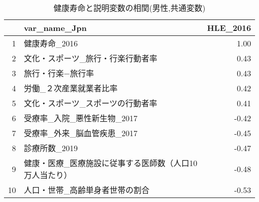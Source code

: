 \begin{table}[H]
\centering
\caption{健康寿命と説明変数の相関(男性,共通変数)}
\label{HLE_d_common_m_corr.tex}
\begingroup\tiny

\begin{adjustbox}{width=.5\textwidth}
\begin{tabular}{rlr}
  \hline
 & var\_name\_Jpn & HLE\_2016 \\
  \hline
1 & 健康寿命\_2016 & 1.00 \\
  2 & 文化・スポーツ\_旅行・行楽行動者率 & 0.43 \\
  3 & 旅行・行楽−旅行率 & 0.43 \\
  4 & 労働\_２次産業就業者比率 & 0.42 \\
  5 & 文化・スポーツ\_スポーツの行動者率 & 0.41 \\
  6 & 受療率\_入院\_悪性新生物\_2017 & -0.42 \\
  7 & 受療率\_外来\_脳血管疾患\_2017 & -0.45 \\
  8 & 診療所数\_2019 & -0.47 \\
  9 & 健康・医療\_医療施設に従事する医師数（人口10万人当たり） & -0.48 \\
  10 & 人口・世帯\_高齢単身者世帯の割合 & -0.53 \\
   \hline
\end{tabular}
\end{adjustbox}

\endgroup
\end{table}
